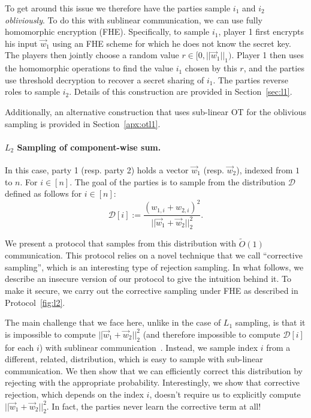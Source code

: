 To get around this issue we therefore have the parties sample $i_1$ and
$i_2$ {\em obliviously}. To do this with sublinear communication, we can
use fully homomorphic encryption (FHE).  Specifically, to sample $i_1$,
player 1 first encrypts his input $\vec{w}_1$ using an FHE scheme for
which he does not know the secret key.  The players then jointly choose
a random value $r \in [0,||\vec{w}_1||_1)$.  Player 1 then uses the
homomorphic operations to find the value $i_1$ chosen by this $r$, and
the parties use threshold decryption to recover a secret sharing of
$i_1$.  The parties reverse roles to sample $i_2$.  Details of this
construction are provided in Section~\ref{sec:l1}.  

Additionally, an alternative construction that uses sub-linear OT for
the oblivious sampling is provided in Section~\ref{apx:otl1}.

\paragraph{$L_2$ Sampling of component-wise sum.}
In this case, party 1 (resp. party 2) holds a  vector
$\vec{w}_1$ (resp. $\vec{w}_2$), indexed from $1$ to $n$. For $i \in
[n]$.
%
The goal of the parties is to sample from the distribution
$\mathcal{D}$ 
defined as follows for $i \in [n]$:
\[
\mathcal{D}[i] := \frac{(w_{1,i} + w_{2,i})^2}{||\vec{w}_1 + \vec{w}_2||_2^2}.
\]

We present a protocol that samples from this distribution with
$\tilde{O}(1)$ communication.
%
This protocol relies on a novel technique that we call ``corrective
sampling'', which is an interesting type of rejection sampling.  In what follows, we describe an insecure version of our protocol to give the intuition behind it.  To make it secure, we carry out the corrective sampling under FHE as described in Protocol~\ref{fig:l2}. 

The main challenge that we face here, unlike in the case of $L_1$ sampling, is that it is impossible to  compute 
$||\vec{w}_1 + \vec{w}_2||_2^2$ (and therefore impossible to  compute $\mathcal{D}[i]$ for each $i$)
with sublinear
communication~\cite{STOC:BabNisSze89}. 
Instead, we sample index $i$ from a different, related, distribution, which is easy to sample with sub-linear communication.  We then show that we
can efficiently correct this distribution by rejecting with the appropriate probability.  Interestingly, we show that corrective rejection, 
which depends on the index $i$, 
doesn't require us to explicitly compute $||\vec{w}_1 + \vec{w}_2||_2^2$.  In fact, 
the parties never learn the corrective term at all!  

